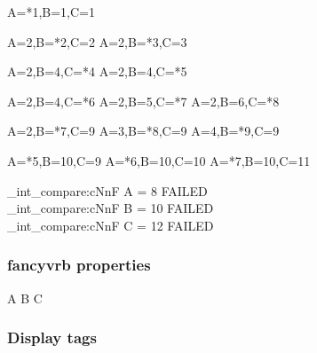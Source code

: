 \begin{CDRBlock} [
  tags={A,B,C},
  numbers=left,
  firstnumber=last,
]
A=*1,B=1,C=1
\end{CDRBlock}

\begin{CDRBlock} [
  tags={B,C},
  numbers=left,
  firstnumber=last,
]
A=2,B=*2,C=2
A=2,B=*3,C=3
\end{CDRBlock}

\begin{CDRBlock} [
  tags=C,
  numbers=left,
  firstnumber=last,
]
A=2,B=4,C=*4
A=2,B=4,C=*5
\end{CDRBlock}

\begin{CDRBlock} [
  tags={C, B},
  numbers=left,
  firstnumber=last,
]
A=2,B=4,C=*6
A=2,B=5,C=*7
A=2,B=6,C=*8
\end{CDRBlock}

\begin{CDRBlock} [
  tags={B, A},
  numbers=left,
  firstnumber=last,
]
A=2,B=*7,C=9
A=3,B=*8,C=9
A=4,B=*9,C=9
\end{CDRBlock}
\begin{CDRBlock} [
  tags={A,C},
  numbers=left,
  firstnumber=last,
]
A=*5,B=10,C=9
A=*6,B=10,C=10
A=*7,B=10,C=11
\end{CDRBlock}

\ExplSyntaxOn
\CDR_int_compare:cNnF { A } = 8 { FAILED \\ }
\CDR_int_compare:cNnF { B } = {10} { FAILED \\ }
\CDR_int_compare:cNnF { C } = {12} { FAILED \\ }
\ExplSyntaxOff

\egroup



\subsubsection{\textsf{fancyvrb} properties}

\bgroup

\begin{CDRBlock} [
  pygments=false,
  tags=none,
  numbers=left,
  firstnumber=last,
]
A
B
C
\end{CDRBlock}

\newpage

\egroup

\subsubsection{Display tags}

